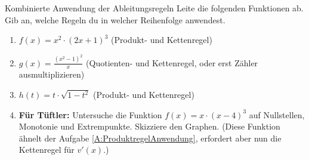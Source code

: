 \begin{aufgabenumgebung}[A:KombinierteAnwendung]{Kombinierte Anwendung der Ableitungsregeln}
Leite die folgenden Funktionen ab. Gib an, welche Regeln du in welcher Reihenfolge anwendest.
\begin{enumerate}
    \item $f(x) = x^2 \cdot (2x+1)^3$ (Produkt- und Kettenregel)
    \item $g(x) = \frac{(x^2-1)^2}{x}$ (Quotienten- und Kettenregel, oder erst Zähler ausmultiplizieren)
    \item $h(t) = t \cdot \sqrt{1-t^2}$ (Produkt- und Kettenregel)
    \item \textbf{Für Tüftler:} Untersuche die Funktion $f(x) = x \cdot (x-4)^3$ auf Nullstellen, Monotonie und Extrempunkte. Skizziere den Graphen. (Diese Funktion ähnelt der Aufgabe \ref{A:ProduktregelAnwendung}, erfordert aber nun die Kettenregel für $v'(x)$.)
\end{enumerate}
\end{aufgabenumgebung}

